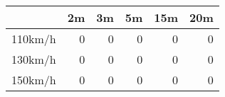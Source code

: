 \begin{tabular}{lrrrrr}
\hline
         &   2m &   3m &   5m &   15m &   20m \\
\hline
 110km/h &    0 &    0 &    0 &     0 &     0 \\
 130km/h &    0 &    0 &    0 &     0 &     0 \\
 150km/h &    0 &    0 &    0 &     0 &     0 \\
\hline
\end{tabular}
